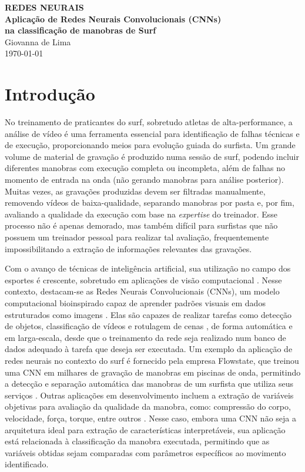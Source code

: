 \documentclass[12pt,a4paper, brazilian]{article}
\begin{document}
\begin{center}
{\fontsize{12}{10}\selectfont\textbf{REDES NEURAIS}}\\[4mm]
{\fontsize{18}{20}\selectfont\textbf{Aplicação de Redes Neurais Convolucionais (CNNs)}}\\[2mm]
{\fontsize{18}{20}\selectfont\textbf{na classificação de manobras de Surf}}\\[3mm]
{\fontsize{14}{15}\selectfont Giovanna de Lima}\\[3mm]
\today\\[5mm] %
\end{center}

\section{Introdução}

No treinamento de praticantes do surf, sobretudo atletas de alta-performance, a análise de vídeo é uma ferramenta essencial para identificação de falhas técnicas e de execução, proporcionando meios para evolução guiada do surfista. Um grande volume de material de gravação é produzido numa sessão de surf, podendo incluir diferentes manobras com execução completa ou incompleta, além de falhas no momento de entrada na onda (não gerando manobras para análise posterior). Muitas vezes, as gravações produzidas devem ser filtradas manualmente, removendo vídeos de baixa-qualidade, separando manobras por pasta e, por fim, avaliando a qualidade da execução com base na \textit{expertise} do treinador. Esse processo não é apenas demorado, mas também difícil para surfistas que não possuem um treinador pessoal para realizar tal avaliação, frequentemente impossibilitando a extração de informações relevantes das gravações.
    
Com o avanço de técnicas de inteligência artificial, sua utilização no campo dos esportes é crescente, sobretudo em aplicações de visão computacional \cite{Eric2024-ie, Fu2025-vz}. Nesse contexto, destacam-se as Redes Neurais Convolucionais (CNNs), um modelo computacional bioinspirado capaz de aprender padrões visuais em dados estruturados como imagens \cite{Baccouche2011-kw}. Elas são capazes de realizar tarefas como detecção de objetos, classificação de vídeos e rotulagem de cenas {\cite{KarpathyCVPR14}}, de forma automática e em larga-escala, desde que o treinamento da rede seja realizado num banco de dados adequado à tarefa que deseja ser executada. Um exemplo da aplicação de redes neurais no contexto do surf é fornecido pela empresa Flowstate, que treinou uma CNN em milhares de gravação de manobras em piscinas de onda, permitindo a detecção e separação automática das manobras de um surfista que utiliza seus serviços \cite{shaw2026flowstate}. Outras aplicações em desenvolvimento incluem a extração de variáveis objetivas para avaliação da qualidade da manobra, como: compressão do corpo, velocidade, força, torque, entre outros \cite{flysurfAISurfing}. Nesse caso, embora uma CNN não seja a arquitetura ideal para extração de características interpretáveis, sua aplicação está relacionada à classificação da manobra executada, permitindo que as variáveis obtidas sejam comparadas com parâmetros específicos ao movimento identificado. 
        
\end{document}
